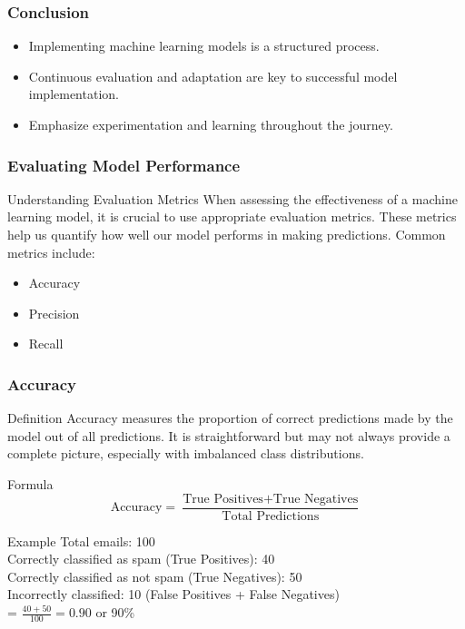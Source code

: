 \documentclass[aspectratio=169]{beamer}
\begin{document}
\begin{frame}[fragile]
    \frametitle{Conclusion}
    \begin{itemize}
        \item Implementing machine learning models is a structured process.
        \item Continuous evaluation and adaptation are key to successful model implementation.
        \item Emphasize experimentation and learning throughout the journey.
    \end{itemize}
\end{frame}

\begin{frame}[fragile]
    \frametitle{Evaluating Model Performance}
    \begin{block}{Understanding Evaluation Metrics}
        When assessing the effectiveness of a machine learning model, it is crucial to use appropriate evaluation metrics. These metrics help us quantify how well our model performs in making predictions. Common metrics include:
        \begin{itemize}
            \item Accuracy
            \item Precision
            \item Recall
        \end{itemize}
    \end{block}
\end{frame}

\begin{frame}[fragile]
    \frametitle{Accuracy}
    \begin{block}{Definition}
        Accuracy measures the proportion of correct predictions made by the model out of all predictions. It is straightforward but may not always provide a complete picture, especially with imbalanced class distributions.
    \end{block}

    \begin{block}{Formula}
        \begin{equation}
        \text{Accuracy} = \frac{\text{True Positives} + \text{True Negatives}}{\text{Total Predictions}}
        \end{equation}
    \end{block}

    \begin{block}{Example}
        Total emails: 100 \\
        Correctly classified as spam (True Positives): 40 \\
        Correctly classified as not spam (True Negatives): 50 \\
        Incorrectly classified: 10 (False Positives + False Negatives) \\
         = $\frac{40 + 50}{100} = 0.90$ or 90\%
    \end{block}
\end{frame}
\end{document}

